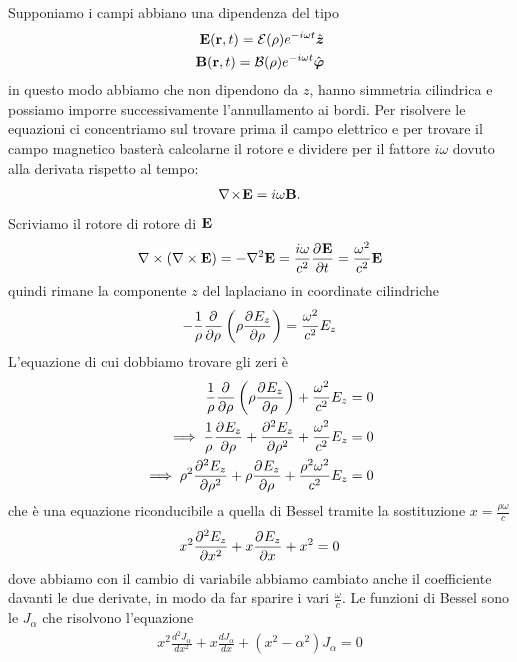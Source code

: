 Supponiamo i campi abbiano una dipendenza del tipo
\begin{align}
  \v{ E }(\v{ r }, t) = \mathcal{E}(\rho)e^{-i\omega t} \vers{z}
  \\
  \v{ B }(\v{ r }, t) = \mathcal{B}(\rho)e^{-i\omega t} \vers{\varphi}
\end{align}
in questo modo abbiamo che non dipendono da $ z $, hanno simmetria cilindrica e possiamo imporre successivamente l'annullamento ai bordi. Per 
risolvere le equazioni ci concentriamo sul trovare prima il campo elettrico e per trovare il campo magnetico basterà calcolarne il rotore e dividere per 
il fattore $ i\omega $ dovuto alla derivata rispetto al tempo:
\begin{align}
  \nabla\!\times\!\v{ E } = i\omega \v{ B }.
\end{align}
Scriviamo il rotore di rotore di $ \v{ E } $
\begin{align}
  \nabla \times \left( \nabla \times \v{ E } \right) = - \nabla^2 \v{ E } = \frac{i\omega}{c^2} \der{\v{ E }}{t} 
  = \frac{\omega^2}{c^2} \v{ E }
\end{align}
quindi rimane la componente $ z $ del laplaciano in coordinate cilindriche
\begin{align}
  -\frac{1}{\rho} \der{}{\rho} \left( \rho \der{E_z}{\rho} \right) = \frac{\omega^2}{c^2} E_z
\end{align}
L'equazione di cui dobbiamo trovare gli zeri è 
\begin{align}
  \frac{1}{\rho} \der{}{\rho} \left( \rho \der{E_z}{\rho} \right) + \frac{\omega^2}{c^2} E_z = 0
  \\
  \implies \frac{1}{\rho}\der{E_z}{\rho} + \der[2]{E_z}{\rho} + \frac{\omega^2}{c^2} E_z = 0
  \\
  \implies \rho^2\der[2]{E_z}{\rho} + \rho \der{E_z}{\rho} + \frac{\rho^2\omega^2}{c^2} E_z = 0
\end{align}
che è una equazione riconducibile a quella di Bessel tramite la sostituzione $ x = \frac{\rho \omega}{c} $
\begin{align}
  x^2 \der[2]{E_z}{x} + x \der{E_z}{x} + x^2 = 0
\end{align}
dove abbiamo con il cambio di variabile abbiamo cambiato anche il coefficiente davanti le due derivate, in modo da far sparire 
i vari $ \frac{\omega}{c} $. Le funzioni di Bessel sono le $ J_{\alpha} $ che risolvono l'equazione
\begin{align}
  x^2 \frac{d^2J_\alpha}{dx^2} + x \frac{dJ_\alpha}{dx} + (x^2 - \alpha^2) J_\alpha = 0
\end{align}
